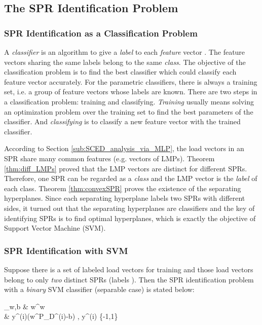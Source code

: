 \documentclass[letterpaper, 11pt]{article}
\theoremstyle{plain}
\theoremstyle{definition}
\begin{document}
\subsection{The SPR Identification Problem} \label{sub:data_driven_approach_revisited}
\subsubsection{SPR Identification as a Classification Problem} \label{ssub:model_as_a_classification_problem}
A \emph{classifier} is an algorithm to give a \emph{label}  to each \emph{feature} vector . 
The feature vectors sharing the same labels belong to the same \emph{class}. The objective of the classification problem is to find the best classifier which could classify each feature vector accurately. For the parametric classifiers, there is always a training set, i.e. a group of feature vectors whose labels are known. There are two steps in a classification problem: training and classifying. \emph{Training} usually means solving an optimization problem over the training set to find the best parameters of the classifier. And \emph{classifying} is to classify a new feature vector with the trained classifier.

According to Section \ref{sub:SCED_analysis_via_MLP},  the load vectors in an SPR share many common features (e.g. vectors of LMPs). Theorem \ref{thm:diff_LMPs} proved that the LMP vectors are distinct for different SPRs. Therefore, one SPR can be regarded as a \emph{class} and the LMP vector is the \emph{label} of each class. Theorem \ref{thm:convexSPR} proves the existence of the separating hyperplanes. Since each separating hyperplane labels two SPRs with different sides, it turned out that the separating hyperplanes are classifiers and the key of identifying SPRs is to find optimal hyperplanes, which is exactly the objective of Support Vector Machine (SVM).




\subsubsection{SPR Identification with SVM} \label{ssub:spr_identification_with_svm}
Suppose there is a set of labeled load vectors for training and those load vectors belong to only \emph{two} distinct SPRs (labels ).
Then the SPR identification problem with a \emph{binary} SVM classifier (separable case) is stated below:

  \min_{w,b} & \qquad {} w^\intercal  w   \label{eqn:separable_SVM_obj} \\ 
   & \qquad y^{(i)}(w^\intercal  P_D^{(i)}-b) , y^{(i)} \in \{-1,1\} \label{eqn:separable_SVM_cons}	
\end{document}
